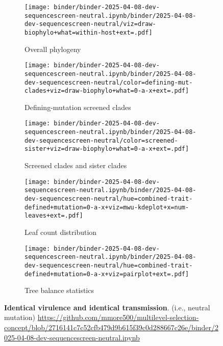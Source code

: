 \begin{figure*}[htbp]
  \centering
  \begin{subfigure}{0.32\textwidth}
    \centering
    \texttt{[image: binder/binder-2025-04-08-dev-sequencescreen-neutral.ipynb/binder/2025-04-08-dev-sequencescreen-neutral/viz=draw-biophylo+what=within-host+ext=.pdf]}
    \caption{Overall phylogeny}
    \label{fig:dev-sequencescreen-neutral:overall_phylogeny}
  \end{subfigure}
  \hfill
  \begin{subfigure}{0.32\textwidth}
    \centering
    \texttt{[image: binder/binder-2025-04-08-dev-sequencescreen-neutral.ipynb/binder/2025-04-08-dev-sequencescreen-neutral/color=defining-mut-clades+viz=draw-biophylo+what=0-a-x+ext=.pdf]}
    \caption{Defining-mutation screened clades}
    \label{fig:dev-sequencescreen-neutral:defining_mut_clades}
  \end{subfigure}
  \hfill
  \begin{subfigure}{0.32\textwidth}
    \centering
    \texttt{[image: binder/binder-2025-04-08-dev-sequencescreen-neutral.ipynb/binder/2025-04-08-dev-sequencescreen-neutral/color=screened-sister+viz=draw-biophylo+what=0-a-x+ext=.pdf]}
    \caption{Screened clades and sister clades}
    \label{fig:dev-sequencescreen-neutral:screened_sister}
  \end{subfigure}

  \vspace{0.5cm} %

  \begin{subfigure}{0.54\textwidth}
    \centering
    \texttt{[image: binder/binder-2025-04-08-dev-sequencescreen-neutral.ipynb/binder/2025-04-08-dev-sequencescreen-neutral/hue=combined-trait-defined+mutation=0-a-x+viz=mwu-kdeplot+x=num-leaves+ext=.pdf]}
    \caption{Leaf count distribution}
    \label{fig:dev-sequencescreen-neutral:leaf_count}
  \end{subfigure}
  \hfill
  \begin{subfigure}{0.44\textwidth}
    \centering
    \texttt{[image: binder/binder-2025-04-08-dev-sequencescreen-neutral.ipynb/binder/2025-04-08-dev-sequencescreen-neutral/hue=combined-trait-defined+mutation=0-a-x+viz=pairplot+ext=.pdf]}
    \caption{Tree balance statistics}
    \label{fig:dev-sequencescreen-neutral:tree_balance}
  \end{subfigure}

  \caption{\textbf{Identical virulence and identical transmission}. (i.e., neutral mutation) \url{https://github.com/mmore500/multilevel-selection-concept/blob/2716141c7c52cfb479d9b615f39c0d288667c26e/binder/2025-04-08-dev-sequencescreen-neutral.ipynb}}
  \label{fig:dev-sequencescreen-neutral}
\end{figure*}
